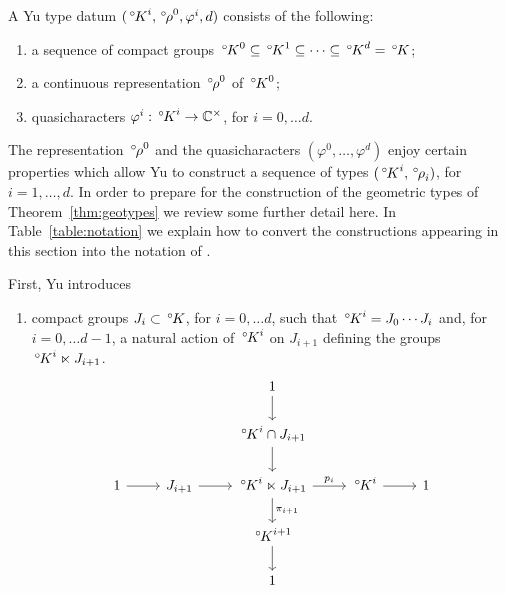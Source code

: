\documentclass[10pt]{amsart}
\makeatletter
\theoremstyle{plain}
\theoremstyle{definition}
\newcommand{\CC}{{\mathbb{C}}}
\newcommand{\labitem}[2]{
\def\@itemlabel{\textbf{#1}}
\item
\def\@currentlabel{#1}\label{#2}}
\newcommand{\oK}{{\,^\circ \hskip-1pt K}}
\newcommand{\orho}{{\,^\circ \hskip-1pt \rho}}
\makeatother
\begin{document}
A Yu type datum $(\oK^i,\orho^0,\varphi^i,d)$ consists of the following:
\begin{enumerate}
\labitem{Y0}{Y0} a sequence of compact groups $\oK^0 \subseteq \oK^1 \subseteq \cdots \subseteq \oK^d = \oK$;
\labitem{Y1}{Y1} a continuous representation $\orho^0$ of $\oK^0$;
\labitem{Y2}{Y2} quasicharacters $\varphi^i : \oK^i \to \CC^\times$, for $i=0, \ldots d$.
\end{enumerate}
The representation $\orho^0$ and the quasicharacters $(\varphi^0, \ldots , \varphi^d)$ enjoy certain properties which allow Yu to construct a sequence of types $(\oK^i,\orho_i)$, for $i=1, \ldots, d$.
%
In order to prepare for the construction of the geometric types of Theorem~\ref{thm:geotypes}  we review some further detail here.
In Table~\ref{table:notation} we explain how to convert the constructions appearing in this section into the notation of \cite{yu:01a}.


First, Yu introduces 
\begin{enumerate}
\labitem{Y3}{Y3}
compact groups $J_i\subset \oK$, for $i=0, \ldots d$, such that 
$
\oK^i = J_0\cdots J_{i}
$ 
and, for $i=0, \ldots d-1$, a natural action of $\oK^i$ on $J_{i+1}$ defining the groups $\oK^i \ltimes J_{i+1}$.
\begin{equation}\label{eq:semiprod}
\begin{tikzcd}
\ && 1 \arrow{d} && \\
\ && \oK^{i}\cap J_{i+1}\arrow{d} && \\
1 \arrow{r} & J_{i+1} \arrow{r} & \oK^i \ltimes J_{i+1} \arrow{d}{\pi_{i+1}} \arrow{r}{p_i} & \oK^i \arrow{r} & 1\\
&& \oK^{i+1} \arrow{d}{} && \\
&& 1 &&
\end{tikzcd}
\end{equation}
\end{enumerate}
%
\end{document}
